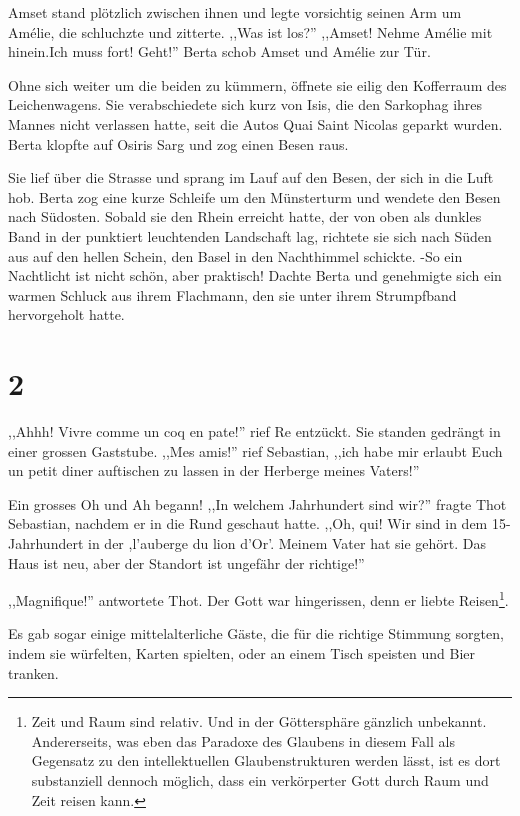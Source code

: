Amset stand plötzlich zwischen ihnen und legte vorsichtig seinen Arm um Amélie, die schluchzte und zitterte. ,,Was ist los?'' ,,Amset! Nehme Amélie mit hinein.Ich muss fort! Geht!'' Berta schob Amset und Amélie zur Tür. 

Ohne sich weiter um die beiden zu kümmern, öffnete sie eilig den Kofferraum des Leichenwagens. Sie verabschiedete sich kurz von Isis, die den Sarkophag ihres Mannes nicht verlassen hatte, seit die Autos Quai Saint Nicolas geparkt wurden. Berta klopfte auf Osiris Sarg und zog einen Besen raus.

Sie lief über die Strasse und sprang im Lauf auf den Besen, der sich in die Luft hob. Berta zog eine kurze Schleife um den Münsterturm und wendete den Besen nach Südosten. Sobald sie den Rhein erreicht hatte, der von oben als dunkles Band in der punktiert leuchtenden Landschaft lag, richtete sie sich nach Süden aus auf den hellen Schein, den Basel in den Nachthimmel schickte. -So ein Nachtlicht ist nicht schön, aber praktisch! Dachte Berta und genehmigte sich ein warmen Schluck aus ihrem Flachmann, den sie unter ihrem Strumpfband hervorgeholt hatte.


\section*{2}

,,Ahhh! Vivre comme un coq en pate!'' rief Re entzückt. Sie standen gedrängt in einer grossen Gaststube. ,,Mes amis!'' rief Sebastian, ,,ich habe mir erlaubt Euch un petit diner auftischen zu lassen in der Herberge meines Vaters!''

Ein grosses Oh und Ah begann! ,,In welchem Jahrhundert sind wir?'' fragte Thot Sebastian, nachdem er in die Rund geschaut hatte. ,,Oh, qui! Wir sind in dem 15-Jahrhundert in der ,l'auberge du lion d'Or'. Meinem Vater hat sie gehört. Das Haus ist neu, aber der Standort ist ungefähr der richtige!'' 

,,Magnifique!'' antwortete Thot. Der Gott war hingerissen, denn er liebte Reisen\footnote{Zeit und Raum sind relativ. Und in der Göttersphäre gänzlich unbekannt. Andererseits, was eben das Paradoxe des Glaubens in diesem Fall als Gegensatz zu den intellektuellen Glaubenstrukturen werden lässt, ist es dort substanziell dennoch möglich, dass ein verkörperter Gott durch Raum und Zeit reisen kann.}.

Es gab sogar einige mittelalterliche Gäste, die für die richtige Stimmung sorgten, indem sie würfelten, Karten spielten, oder an einem Tisch speisten und Bier tranken.

